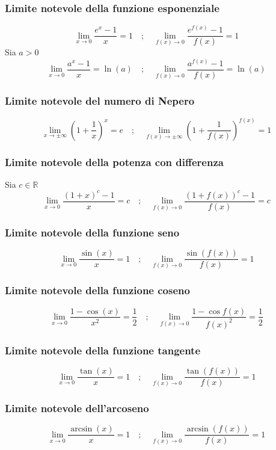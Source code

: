 \documentclass[a4paper,14pt]{extarticle}
\newcommand{\R}{\mathbb{R}}
\begin{document}
\subsubsection{Limite notevole della funzione esponenziale}
\[ \lim_{x \to 0}\frac{e^x - 1}{x} = 1 \quad;\quad \lim_{f(x) \to 0}\frac{e^{f(x)} - 1}{f(x)} = 1 \]
Sia $a > 0$
\[ \lim_{x \to 0}\frac{a^x - 1}{x} = \ln{(a)} \quad;\quad \lim_{f(x) \to 0}\frac{a^{f(x)} - 1}{f(x)} = \ln{(a)} \]

\subsubsection{Limite notevole del numero di Nepero}
\[ \lim_{x \to \pm \infty} \left(1 + \frac{1}{x} \right)^x = e \quad;\quad \lim_{f(x) \to \pm \infty}\left(1 + \frac{1}{f(x)} \right)^{f(x)} = 1 \]

\subsubsection{Limite notevole della potenza con differenza}
Sia $c \in \R$
\[ \lim_{x \to 0}\frac{(1 + x)^c - 1}{x} = c \quad;\quad \lim_{f(x) \to 0}\frac{(1 + f(x))^c - 1}{f(x)} = c\]

\subsubsection{Limite notevole della funzione seno}
\[ \lim_{x \to 0}\frac{\sin{(x)}}{x} = 1 \quad;\quad \lim_{f(x) \to 0}\frac{\sin{(f(x))}}{f(x)} = 1 \]

\subsubsection{Limite notevole della funzione coseno}
\[ \lim_{x \to 0}\frac{1 - \cos{(x)}}{x^2} = \frac{1}{2} \quad;\quad \lim_{f(x) \to 0}\frac{1 - \cos{f(x)}}{f(x)^2} = \frac{1}{2} \]

\subsubsection{Limite notevole della funzione tangente}
\[ \lim_{x \to 0}\frac{\tan(x)}{x} = 1 \quad;\quad \lim_{f(x) \to 0}\frac{\tan(f(x))}{f(x)} = 1 \]

\subsubsection{Limite notevole dell'arcoseno}
\[ \lim_{x \to 0}\frac{\arcsin{(x)}}{x} = 1 \quad;\quad \lim_{f(x) \to 0}\frac{\arcsin{(f(x))}}{f(x)} = 1 \]
\end{document}
